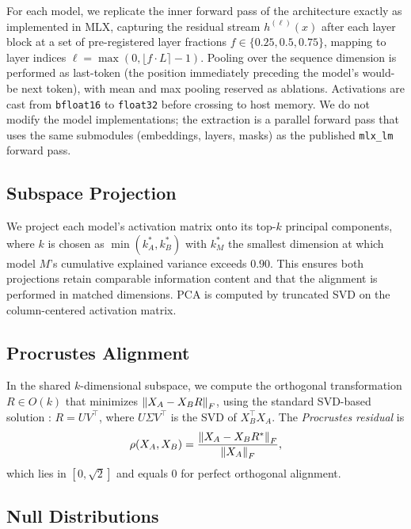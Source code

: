 For each model, we replicate the inner forward pass of the architecture
exactly as implemented in MLX, capturing the residual stream
$h^{(\ell)}(x)$ after each layer block at a set of pre-registered layer
fractions $f \in \{0.25, 0.5, 0.75\}$, mapping to layer indices
$\ell = \max(0, \lfloor f \cdot L \rceil - 1)$. Pooling over the sequence
dimension is performed as last-token (the position immediately preceding
the model's would-be next token), with mean and max pooling reserved as
ablations. Activations are cast from \texttt{bfloat16} to \texttt{float32}
before crossing to host memory. We do not modify the model implementations;
the extraction is a parallel forward pass that uses the same submodules
(embeddings, layers, masks) as the published \texttt{mlx\_lm} forward pass.

\subsection{Subspace Projection}

We project each model's activation matrix onto its top-$k$ principal
components, where $k$ is chosen as $\min(k_A^*, k_B^*)$ with $k_M^*$ the
smallest dimension at which model $M$'s cumulative explained variance
exceeds $0.90$. This ensures both projections retain comparable
information content and that the alignment is performed in matched
dimensions. PCA is computed by truncated SVD on the column-centered
activation matrix.

\subsection{Procrustes Alignment}

In the shared $k$-dimensional subspace, we compute the orthogonal
transformation $R \in O(k)$ that minimizes $\left\lVert X_A - X_B R\right\rVert_F$, using
the standard SVD-based solution \cite{schonemann1966generalized}:
$R = U V^\top$, where $U \Sigma V^\top$ is the SVD of $X_B^\top X_A$.
The \emph{Procrustes residual} is
\begin{equation}
\rho(X_A, X_B) = \frac{\left\lVert X_A - X_B R^*\right\rVert_F}{\left\lVert X_A\right\rVert_F},
\label{eq:procrustes-residual}
\end{equation}
which lies in $[0, \sqrt{2}]$ and equals $0$ for perfect orthogonal
alignment.

\subsection{Null Distributions}

